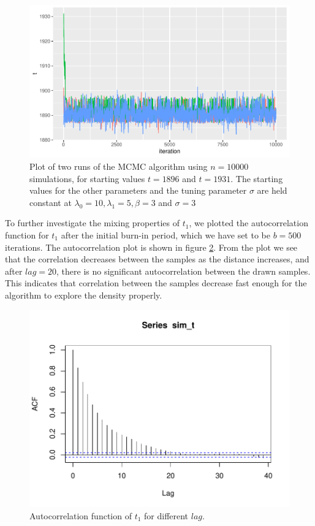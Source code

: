 \begin{figure}
    \centering
    \includegraphics[width = \textwidth]{Images/mixing_.pdf}
    \caption{Plot of two runs of the MCMC algorithm using $n = 10000$ simulations, for starting values $t = 1896$ and $t = 1931$. The starting values for the other parameters and the tuning parameter $\sigma$ are held constant at $\lambda_0 = 10, \lambda_1 = 5, \beta = 3$ and $\sigma = 3$}
    \label{fig:sim_mixing_t}
\end{figure}

To further investigate the mixing properties of $t_1$, we plotted the autocorrelation function for $t_1$ after the initial burn-in period, which we have set to be $b = 500$ iterations. The autocorrelation plot is shown in figure \ref{fig:acf_t}. From the plot we see that the correlation decreases between the samples as the distance increases, and after $lag = 20$, there is no significant autocorrelation between the drawn samples. This indicates that correlation between the samples decrease fast enough for the algorithm to explore the density properly. 

\begin{figure}[h!]
    \centering
    \includegraphics[width = \textwidth]{Images/acf_t_10000.pdf}
    \caption{Autocorrelation function of $t_1$ for different $lag$. }
    \label{fig:acf_t}
\end{figure}

